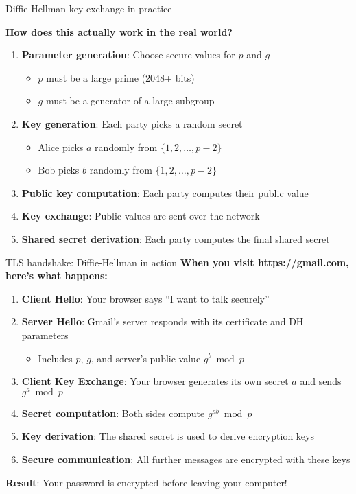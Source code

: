 \documentclass[aspectratio=169, lualatex, handout]{beamer}
\begin{document}
\begin{frame}{Diffie-Hellman key exchange in practice}
	\begin{center}
		\Large\textbf{How does this actually work in the real world?}
	\end{center}
	\vspace{0.5cm}
	\begin{enumerate}[<+->]
		\item \textbf{Parameter generation}: Choose secure values for $p$ and $g$
		      \begin{itemize}
			      \item $p$ must be a large prime (2048+ bits)
			      \item $g$ must be a generator of a large subgroup
		      \end{itemize}
		\item \textbf{Key generation}: Each party picks a random secret
		      \begin{itemize}
			      \item Alice picks $a$ randomly from $\{1, 2, \ldots, p-2\}$
			      \item Bob picks $b$ randomly from $\{1, 2, \ldots, p-2\}$
		      \end{itemize}
		\item \textbf{Public key computation}: Each party computes their public value
		\item \textbf{Key exchange}: Public values are sent over the network
		\item \textbf{Shared secret derivation}: Each party computes the final shared secret
	\end{enumerate}
\end{frame}

\begin{frame}{TLS handshake: Diffie-Hellman in action}
	\textbf{When you visit https://gmail.com, here's what happens:}
	\vspace{0.5cm}
	\begin{enumerate}[<+->]
		\item \textbf{Client Hello}: Your browser says ``I want to talk securely''
		\item \textbf{Server Hello}: Gmail's server responds with its certificate and DH parameters
		      \begin{itemize}
			      \item Includes $p$, $g$, and server's public value $g^b \bmod p$
		      \end{itemize}
		\item \textbf{Client Key Exchange}: Your browser generates its own secret $a$ and sends $g^a \bmod p$
		\item \textbf{Secret computation}: Both sides compute $g^{ab} \bmod p$
		\item \textbf{Key derivation}: The shared secret is used to derive encryption keys
		\item \textbf{Secure communication}: All further messages are encrypted with these keys
	\end{enumerate}
	\vspace{0.5cm}
	\textbf{Result}: Your password is encrypted before leaving your computer!
\end{frame}
\end{document}
